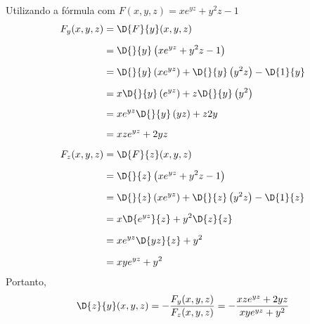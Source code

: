 \documentclass[a4paper,12pt,fleqn]{article}
\begin{document}
\begin{answer}
  Utilizando a fórmula com \(F(x, y, z) = x e^{yz} + y^2z - 1\)
  \begin{align*}
    F_y(x, y, z)
    & = \D{F}{y}(x, y, z) \\[2mm]
    & = \D{}{y} \left(x e^{yz} + y^2z - 1\right) \\[2mm]
    & = \D{}{y} \left(x e^{yz}\right)
      + \D{}{y} \left(y^2z\right)
      - \D{1}{y} \\[2mm]
    & = x\D{}{y} \left(e^{yz}\right)
      + z\D{}{y} \left(y^2\right) \\[2mm]
    & = xe^{yz}\D{}{y} \left(yz\right) + z2y \\[2mm]
    & = xze^{yz} + 2yz
    \\[2mm]
    F_z(x, y, z)
    & = \D{F}{z}(x, y, z) \\[2mm]
    & = \D{}{z} \left(x e^{yz} + y^2z - 1\right) \\[2mm]
    & = \D{}{z} \left(x e^{yz}\right)
      + \D{}{z} \left(y^2z\right)
      - \D{1}{z} \\[2mm]
    & = x\D{e^{yz}}{z} + y^2\D{z}{z} \\[2mm]
    & = xe^{yz}\D{yz}{z} + y^2 \\[2mm]
    & = xye^{yz} + y^2
  \end{align*}
  Portanto,
  \[
    \D{z}{y}(x, y, z)
    = -\frac{F_y(x, y, z)}{F_z(x, y, z)}
    = -\frac{xze^{yz} + 2yz}{xye^{yz} + y^2}
  \]
\end{answer}

\end{document}
